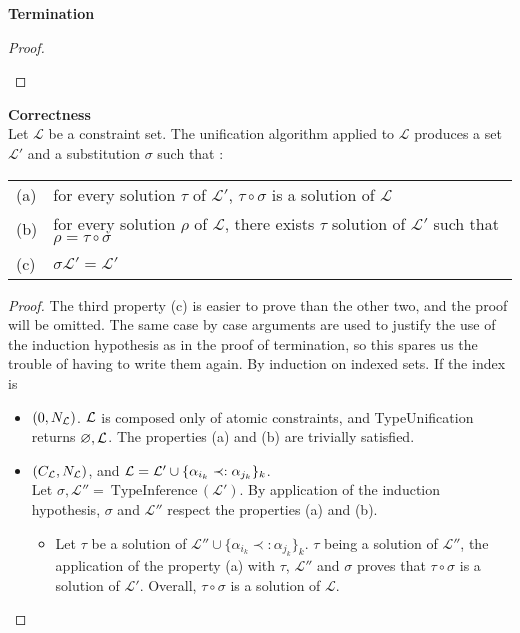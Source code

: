 \begin{thm}{\bf Termination}
\begin{proof}
\begin{itemize}
		\end{itemize}
	\end{proof}
\end{thm}

\begin{thm}{\bf Correctness} \\
	Let $\mathcal{L}$ be a constraint set. The unification algorithm applied to $\mathcal{L}$ produces a
	set $\mathcal{L'}$ and a substitution $\sigma$ such that :
		\begin{center}
		\begin{tabular}{ll}
			(a) & for every solution $\tau$ of $\mathcal{L'}$, $\tau \circ \sigma$ is a solution of $\mathcal{L}$ \\
			(b) & for every solution $\rho$ of $\mathcal{L}$, there exists $\tau$ solution of $\mathcal{L'}$ such that $\rho = \tau \circ \sigma$ \\
			(c) & $\sigma \mathcal{L'} = \mathcal{L'}$
		\end{tabular}
		\end{center}

	\begin{proof}
		The third property (c) is easier to prove than the other two, and the proof will be omitted. The same case by case arguments are
		used to justify the use of the induction hypothesis as in the proof of termination, so this spares us the trouble of having to write
		them again. By induction on indexed sets. If the index is
		\begin{itemize}
			\item $(0, N_{\mathcal{L}})$. $\mathcal{L}$ is composed only of atomic constraints, and TypeUnification returns $\varnothing, \mathcal{L}$.
				The properties (a) and (b) are trivially satisfied.
				
			\item $(C_{\mathcal{L}}, N_{\mathcal{L}})$, and $\mathcal{L} = \mathcal{L}' \cup \{ \alpha_{i_k} \prec: \alpha_{j_k} \}_k$. \\
				Let $\sigma, \mathcal{L''} = ~\text{TypeInference}\,(\mathcal{L'})$. By application of the induction hypothesis, $\sigma$ and
				$\mathcal{L''}$ respect the properties (a) and (b).
					\begin{itemize}
						\item[(a)] Let $\tau$ be a solution of $\mathcal{L''} \cup \{ \alpha_{i_k} \prec: \alpha_{j_k} \}_k$.
							$\tau$ being a solution of $\mathcal{L''}$, the application of the property (a) with $\tau$, $\mathcal{L''}$ and
							$\sigma$ proves that $\tau \circ \sigma$ is a solution of $\mathcal{L'}$. Overall, $\tau \circ \sigma$ is a
							solution of $\mathcal{L}$.
							

\end{itemize}
\end{itemize}
\end{proof}
\end{thm}
